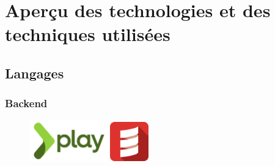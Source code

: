 \section{Aperçu des technologies et des techniques utilisées}

\subsection{Langages}
\label{sub:Langages}
\subsubsection{Backend}
\label{subs:Backend}
\begin{figure}[h]
  \begin{center}
    \includegraphics[width=0.3\textwidth]{Pictures/play_logo.png}
    \hspace{1in}
    \includegraphics[width=0.15\textwidth]{Pictures/scala_logo.png}
  \end{center}
\end{figure}
